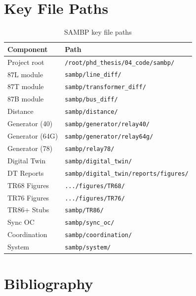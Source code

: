 \documentclass[11pt,a4paper]{report}
\begin{document}
\chapter{Key File Paths}
\label{app:paths}

\begin{table}[ht]
\centering
\caption{SAMBP key file paths}
\small
\begin{tabular}{ll}
\toprule
Component & Path \\
\midrule
Project root & \texttt{/root/phd\_thesis/04\_code/sambp/} \\
87L module & \texttt{sambp/line\_diff/} \\
87T module & \texttt{sambp/transformer\_diff/} \\
87B module & \texttt{sambp/bus\_diff/} \\
Distance & \texttt{sambp/distance/} \\
Generator (40) & \texttt{sambp/generator/relay40/} \\
Generator (64G) & \texttt{sambp/generator/relay64g/} \\
Generator (78) & \texttt{sambp/relay78/} \\
Digital Twin & \texttt{sambp/digital\_twin/} \\
DT Reports & \texttt{sambp/digital\_twin/reports/figures/} \\
TR68 Figures & \texttt{.../figures/TR68/} \\
TR76 Figures & \texttt{.../figures/TR76/} \\
TR86+ Stubs & \texttt{sambp/TR86/} \\
Sync OC & \texttt{sambp/sync\_oc/} \\
Coordination & \texttt{sambp/coordination/} \\
System & \texttt{sambp/system/} \\
\bottomrule
\end{tabular}
\end{table}

\chapter{Bibliography}
\label{app:bib}
\end{document}
